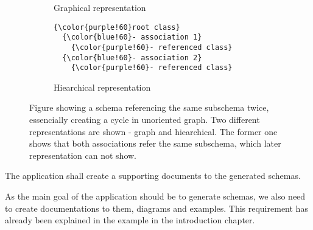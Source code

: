 \begin{figure}\centering
    \begin{subfigure}{.5\textwidth}
        \centering
        \caption{Graphical representation}
      \end{subfigure}%
      \begin{subfigure}{.5\textwidth}
\begin{Verbatim}[commandchars=\\\{\}]
{\color{purple!60}root class}
  {\color{blue!60}- association 1}
    {\color{purple!60}- referenced class}
  {\color{blue!60}- association 2}
    {\color{purple!60}- referenced class}
\end{Verbatim}
        \caption{Hiearchical representation}
      \end{subfigure}

    \caption{Figure showing a schema referencing the same subschema twice, essencially creating a cycle in unoriented graph. Two different representations are shown - graph and hiearchical.  The former one shows that both associations refer the same subschema, which later representation can not show.}
    \label{analysis/difference-between-graphical-and-hiearchical}
\end{figure}


\begin{requirement}
    The application shall create a supporting documents to the generated schemas.
\end{requirement}

As the main goal of the application should be to generate schemas, we also need to create documentations to them, diagrams and examples. This requirement has already been explained in the example in the introduction chapter.

